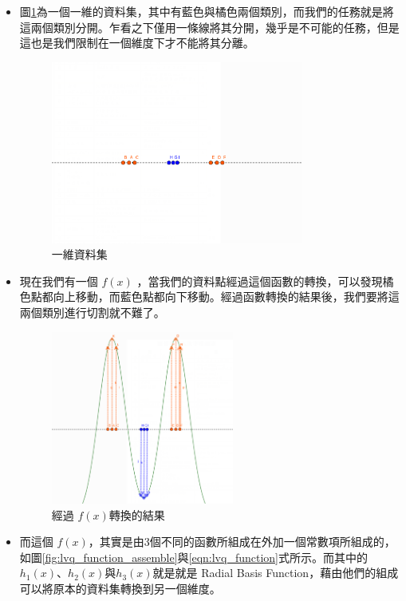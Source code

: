 \begin{itemize}
	\item

	      圖\ref{fig:rbf_introduction_not_transfer}為一個一維的資料集，其中有藍色與橘色兩個類別，而我們的任務就是將這兩個類別分開。乍看之下僅用一條線將其分開，幾乎是不可能的任務，但是這也是我們限制在一個維度下才不能將其分離。



	      \begin{figure}[h]
		      \centering
		      \includegraphics[height=6cm]{./pic/vM4xT9rm.png}
		      \caption{一維資料集}
		      \label{fig:rbf_introduction_not_transfer}
	      \end{figure}

	\item
	      現在我們有一個 \(f(x)\) ，當我們的資料點經過這個函數的轉換，可以發現橘色點都向上移動，而藍色點都向下移動。經過函數轉換的結果後，我們要將這兩個類別進行切割就不難了。

	      \begin{figure}[h]
		      \centering
		      \includegraphics[width=6cm]{./pic/7VM3Lid5.png}
		      \caption{經過 \(f(x)\)轉換的結果 }
		      \label{fig:rbf_with_function}
	      \end{figure}


	\item
	      而這個 \(f(x)\)，其實是由3個不同的函數所組成在外加一個常數項所組成的，如圖\ref{fig:lvq_function_assemble}與\ref{eqn:lvq_function}式所示。而其中的 \(h_1(x)\)、\(h_2(x)\)與\(h_3(x)\)就是就是 Radial Basis Function，藉由他們的組成可以將原本的資料集轉換到另一個維度。


\end{itemize}
